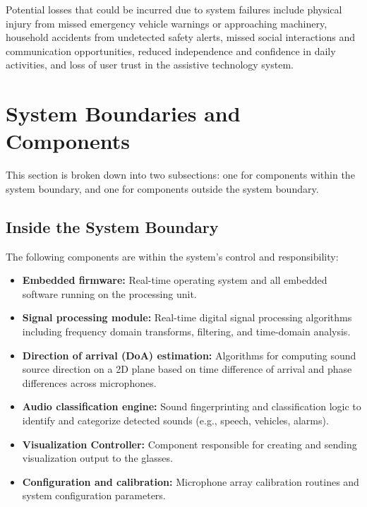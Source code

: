 \documentclass{article}
\begin{document}
Potential losses that could be incurred due to system failures include physical
injury from missed emergency vehicle warnings or approaching machinery,
household accidents from undetected safety alerts, missed social interactions
and communication opportunities, reduced independence and confidence in daily
activities, and loss of user trust in the assistive technology system.

\section{System Boundaries and Components}

This section is broken down into two subsections: one for components within the
system boundary, and one for components outside the system boundary.

\subsection{Inside the System Boundary}

The following components are within the system's control and responsibility:

\begin{itemize}
\item \textbf{Embedded firmware:} Real-time operating system and all embedded
software running on the processing unit.

\item \textbf{Signal processing module:} Real-time digital signal processing
algorithms including frequency domain transforms, filtering, and time-domain
analysis.

\item \textbf{Direction of arrival (DoA) estimation:} Algorithms for computing
sound source direction on a 2D plane based on time difference of arrival and
phase differences across microphones.

\item \textbf{Audio classification engine:} Sound fingerprinting and
classification logic to identify and categorize detected sounds (e.g., speech,
vehicles, alarms).

\item \textbf{Visualization Controller:} \label{comp:viz_controller} Component
responsible for creating and sending visualization output to the glasses.

\item \textbf{Configuration and calibration:} Microphone array calibration
routines and system configuration parameters.
\end{itemize}
\end{document}

